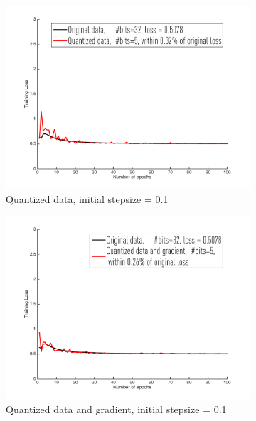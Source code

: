 \documentclass{article}
\begin{document}
\begin{figure}[h]
\centering
    \begin{subfigure}[h]{.3\columnwidth}
    \includegraphics[width=\columnwidth]{lr/synthetic/20easy/d01}
    \caption{Quantized data, initial stepsize = 0.1}
    \end{subfigure}
    \begin{subfigure}[h]{.3\columnwidth}
    \includegraphics[width=\columnwidth]{lr/synthetic/20easy/dg01}
    \caption{Quantized data and gradient, initial stepsize = 0.1}
    \end{subfigure}
    \begin{subfigure}[h]{.3\columnwidth}

\end{subfigure}
\end{figure}
\end{document}
